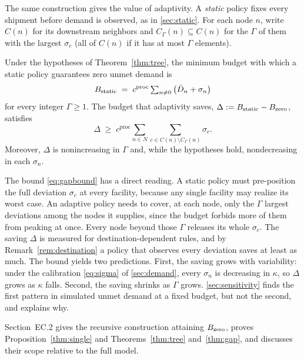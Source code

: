 \documentclass[11pt]{article}
\begin{document}
The same construction gives the value of adaptivity.
A \emph{static} policy fixes every shipment before demand is observed, as in \Sec\ref{sec:static}.
For each node $n$, write $C(n)$ for its downstream neighbors and $C_\Gamma(n) \subseteq C(n)$ for the $\Gamma$ of them with the largest $\sigma_c$ (all of $C(n)$ if it has at most $\Gamma$ elements).

\begin{theorem}
\label{thm:gap}
Under the hypotheses of Theorem~\ref{thm:tree}, the minimum budget with which a static policy guarantees zero unmet demand is
\begin{equation}
B_{\rm static} \;=\; c^{\text{proc}} \textstyle\sum_{n \neq 0} \big(\bar D_n + \sigma_n\big)
\label{eq:bstatic}
\end{equation}
for every integer $\Gamma \ge 1$.
The budget that adaptivity saves, $\Delta := B_{\rm static} - B_{\rm zero}$, satisfies
\begin{equation}
\Delta \;\ge\; c^{\text{proc}} \textstyle\sum_{n \in N} \sum_{c \in C(n) \setminus C_\Gamma(n)} \sigma_c.
\label{eq:gapbound}
\end{equation}
Moreover, $\Delta$ is nonincreasing in $\Gamma$ and, while the hypotheses hold, nondecreasing in each $\sigma_n$.
\end{theorem}

The bound \eqref{eq:gapbound} has a direct reading.
A static policy must pre-position the full deviation $\sigma_c$ at every facility, because any single facility may realize its worst case.
An adaptive policy needs to cover, at each node, only the $\Gamma$ largest deviations among the nodes it supplies, since the budget forbids more of them from peaking at once.
Every node beyond those $\Gamma$ releases its whole $\sigma_c$.
The saving $\Delta$ is measured for destination-dependent rules, and by Remark~\ref{rem:destination} a policy that observes every deviation saves at least as much.
The bound yields two predictions.
First, the saving grows with variability: under the calibration \eqref{eq:sigma} of \Sec\ref{sec:demand}, every $\sigma_n$ is decreasing in $\kappa$, so $\Delta$ grows as $\kappa$ falls.
Second, the saving shrinks as $\Gamma$ grows.
\Sec\ref{sec:sensitivity} finds the first pattern in simulated unmet demand at a fixed budget, but not the second, and explains why.

Section~EC.2 gives the recursive construction attaining $B_{\rm zero}$, proves Proposition~\ref{thm:single} and Theorems~\ref{thm:tree} and~\ref{thm:gap}, and discusses their scope relative to the full model.
\end{document}
